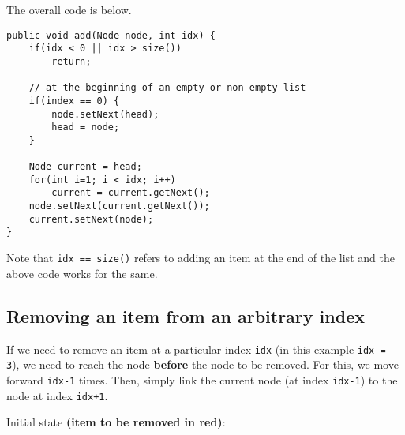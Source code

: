 \newpage

The overall code is below.

\begin{lstlisting}
public void add(Node node, int idx) {
	if(idx < 0 || idx > size()) 
		return;
	
	// at the beginning of an empty or non-empty list
	if(index == 0) { 
		node.setNext(head);
		head = node;
	}
	
	Node current = head;
	for(int i=1; i < idx; i++)
		current = current.getNext();
	node.setNext(current.getNext());
	current.setNext(node);
}
\end{lstlisting}

Note that \texttt{idx == size()} refers to adding an item at the end of the list and the above code works for the same.

\newpage

\subsection{Removing an item from an arbitrary index}

If we need to remove an item at a particular index \texttt{idx} (in this example \texttt{idx = 3}), we need to reach the node \textbf{before} the node to be removed. For this, we move forward \texttt{idx-1} times. Then, simply link the current node (at index \texttt{idx-1}) to the node at index \texttt{idx+1}.

Initial state \textbf{(item to be removed in red)}:
\vskip 0.2cm

\vskip 0.2cm

